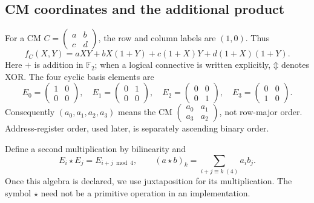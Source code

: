 \documentclass[11pt,a4paper]{article}
\theoremstyle{definition}\newtheorem{definition}[theorem]{Definition}
\theoremstyle{remark}\newtheorem{remark}[theorem]{Remark}
\newcommand{\F}{\mathbb F}
\newcommand{\Xor}{\mathbin{\Updownarrow}}
\numberwithin{equation}{section}
\begin{document}
\subsection{CM coordinates and the additional product}
For a CM $C=\left(\begin{smallmatrix}a&b\\c&d\end{smallmatrix}\right)$, the row and column labels are $(1,0)$. Thus
\begin{equation}\label{eq:predicate}
 f_C(X,Y)=aXY+bX(1+Y)+c(1+X)Y+d(1+X)(1+Y).
\end{equation}
Here $+$ is addition in $\F_2$; when a logical connective is written explicitly, $\Xor$ denotes XOR. The four cyclic basis elements are
\[
 E_0=\begin{pmatrix}1&0\\0&0\end{pmatrix},\quad
 E_1=\begin{pmatrix}0&1\\0&0\end{pmatrix},\quad
 E_2=\begin{pmatrix}0&0\\0&1\end{pmatrix},\quad
 E_3=\begin{pmatrix}0&0\\1&0\end{pmatrix}.
\]
Consequently $(a_0,a_1,a_2,a_3)$ means the CM
$\left(\begin{smallmatrix}a_0&a_1\\a_3&a_2\end{smallmatrix}\right)$, not row-major order. Address-register order, used later, is separately ascending binary order.

Define a second multiplication by bilinearity and
\begin{equation}\label{eq:convolution}
 E_i\star E_j=E_{i+j\bmod4},\qquad
 (a\star b)_k=\sum_{i+j\equiv k\;(4)}a_i b_j.
\end{equation}
Once this algebra is declared, we use juxtaposition for its multiplication. The symbol $\star$ need not be a primitive operation in an implementation.
\end{document}
